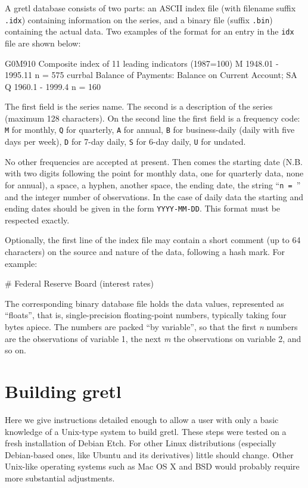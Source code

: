 A gretl database consists of two parts: an ASCII index file (with
filename suffix \texttt{.idx}) containing information on the series,
and a binary file (suffix \texttt{.bin}) containing the actual data.
Two examples of the format for an entry in the \texttt{idx} file are
shown below:

\begin{code}
G0M910  Composite index of 11 leading indicators (1987=100) 
M 1948.01 - 1995.11  n = 575
currbal Balance of Payments: Balance on Current Account; SA 
Q 1960.1 - 1999.4 n = 160
\end{code}

The first field is the series name.  The second is a description of
the series (maximum 128 characters).  On the second line the first
field is a frequency code: \texttt{M} for monthly, \texttt{Q} for
quarterly, \texttt{A} for annual, \texttt{B} for business-daily (daily
with five days per week), \texttt{D} for 7-day daily, \texttt{S} for
6-day daily, \texttt{U} for undated.

No other frequencies are accepted at present.  Then comes the starting
date (N.B. with two digits following the point for monthly data, one
for quarterly data, none for annual), a space, a hyphen, another
space, the ending date, the string ``\verb+n = +'' and the integer
number of observations. In the case of daily data the starting and
ending dates should be given in the form \verb+YYYY-MM-DD+. This
format must be respected exactly.

Optionally, the first line of the index file may contain a short
comment (up to 64 characters) on the source and nature of the data,
following a hash mark.  For example:

\begin{code}
# Federal Reserve Board (interest rates)
\end{code}

The corresponding binary database file holds the data values,
represented as ``floats'', that is, single-precision floating-point
numbers, typically taking four bytes apiece.  The numbers are packed
``by variable'', so that the first \emph{n} numbers are the
observations of variable 1, the next \emph{m} the observations on
variable 2, and so on.

\chapter{Building gretl}
\label{app-build}

Here we give instructions detailed enough to allow a user
with only a basic knowledge of a Unix-type system to build gretl.
These steps were tested on a fresh installation of Debian Etch. For
other Linux distributions (especially Debian-based ones, like Ubuntu
and its derivatives) little should change. Other Unix-like operating
systems such as Mac OS X and BSD would probably require more substantial
adjustments.

